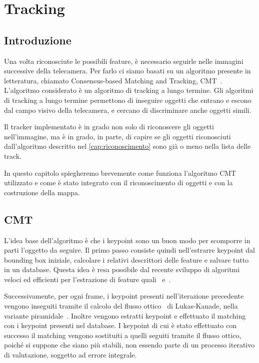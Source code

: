 \chapter{Tracking}
\label{cap:tracking}
\thispagestyle{empty}

\begin{quotation}
{\footnotesize
\noindent\emph{}
\begin{flushright}
\end{flushright}
}
\end{quotation}
\vspace{0.5cm}

\section{Introduzione}

Una volta riconosciute le possibili feature, è necessario seguirle nelle immagini successive della telecamera.
Per farlo ci siamo basati su un algoritmo presente in letteratura, chiamato Consensus-based Matching and Tracking, CMT~\cite{Nebehay2014WACV}.
L'algoritmo considerato è un algoritmo di tracking a lungo termine. Gli algoritmi di tracking a lungo termine permettono di inseguire oggetti che entrano e escono dal campo visivo della telecamera, e cercano di discriminare anche oggetti simili.

Il tracker implementato è in grado non solo di riconoscere gli oggetti nell'immagine, ma è in grado, in parte, di capire se gli oggetti riconosciuti dall'algoritmo descritto nel \autoref{cap:riconoscimento} sono già o meno nella lista delle track.

In questo capitolo spiegheremo brevemente come funziona l'algoritmo CMT utilizzato e come è stato integrato con il riconoscimento di oggetti e con la costruzione della mappa.

\section{CMT}

L'idea base dell'algoritmo è che i keypoint sono un buon modo per scomporre in parti l'oggetto da seguire. Il primo passo consiste quindi nell'estrarre keypoint dal bounding box iniziale, calcolare i relativi descrittori delle feature e salvare tutto in un database. Questa idea è resa possibile dal recente sviluppo di algoritmi veloci ed efficienti per l'estrazione di feature quali~\cite{rosten_2006_machine} e~\cite{6126542}.

Successivamente, per ogni frame, i keypoint presenti nell'iterazione precedente vengono inseguiti tramite il calcolo del flusso ottico~\cite{Lucas:1981:IIR:1623264.1623280} di Lukas-Kanade, nella variante piramidale~\cite{Bouguet00pyramidalimplementation}. Inoltre vengono estratti keypoint e effettuato il matching con i keypoint presenti nel database. I keypoint di cui è stato effettuato con successo il matching vengono sostituiti a quelli seguiti tramite il flusso ottico, poiché si suppone che siano più stabili, non essendo parte di un processo iterativo di valutazione, soggetto ad errore integrale.

